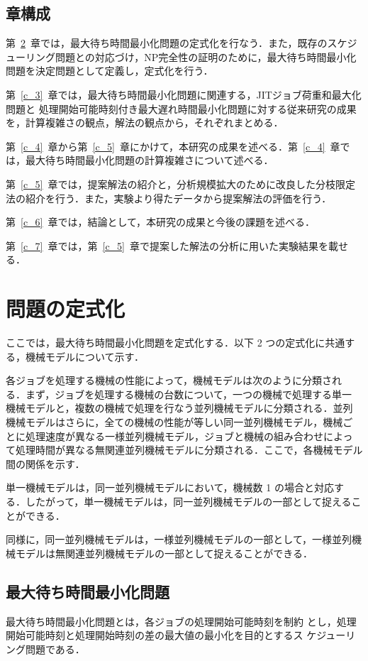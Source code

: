 \documentclass[12pt]{optlab-bachelor}
\begin{document}
\section{章構成}
第~\ref{c_2}~章では，最大待ち時間最小化問題の定式化を行なう．また，既存のスケジューリング問題との対応づけ，NP完全性の証明のために，最大待ち時間最小化問題を決定問題として定義し，定式化を行う．

第~\ref{c_3}~章では，最大待ち時間最小化問題に関連する，JITジョブ荷重和最大化問題と
処理開始可能時刻付き最大遅れ時間最小化問題に対する従来研究の成果を，計算複雑さの観点，解法の観点から，それぞれまとめる．

第~\ref{c_4}~章から第~\ref{c_5}~章にかけて，本研究の成果を述べる．第~\ref{c_4}~章では，最大待ち時間最小化問題の計算複雑さについて述べる．

第~\ref{c_5}~章では，提案解法の紹介と，分析規模拡大のために改良した分枝限定法の紹介を行う．また，実験より得たデータから提案解法の評価を行う．

第~\ref{c_6}~章では，結論として，本研究の成果と今後の課題を述べる．

第~\ref{c_7}~章では，第~\ref{c_5}~章で提案した解法の分析に用いた実験結果を載せる．

\chapter{問題の定式化}\label{c_2}
ここでは，最大待ち時間最小化問題を定式化する．以下 2 つの定式化に共通する，機械モデルについて示す．

各ジョブを処理する機械の性能によって，機械モデルは次のように分類され
る．まず，ジョブを処理する機械の台数について，一つの機械で処理する単一
機械モデルと，複数の機械で処理を行なう並列機械モデルに分類される．並列
機械モデルはさらに，全ての機械の性能が等しい同一並列機械モデル，機械ご
とに処理速度が異なる一様並列機械モデル，ジョブと機械の組み合わせによっ
て処理時間が異なる無関連並列機械モデルに分類される．ここで，各機械モデル間の関係を示す．

単一機械モデルは，同一並列機械モデルにおいて，機械数 1 の場合と対応する．したがって，単一機械モデルは，同一並列機械モデルの一部として捉えることができる．

同様に，同一並列機械モデルは，一様並列機械モデルの一部として，一様並列機械モデルは無関連並列機械モデルの一部として捉えることができる．

\section{最大待ち時間最小化問題}
最大待ち時間最小化問題とは，各ジョブの処理開始可能時刻を制約
とし，処理開始可能時刻と処理開始時刻の差の最大値の最小化を目的とするス
ケジューリング問題である．
\end{document}

